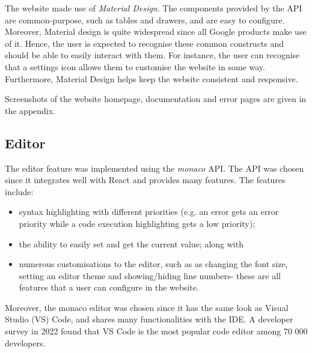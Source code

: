 

The website made use of \emph{Material Design}. The components provided by the API are common-purpose, such as tables and drawers, and are easy to configure. Moreover, Material design is quite widespread since all Google products make use of it. 
Hence, the user is expected to recognise these common constructs and should be able to easily interact with them. For instance, the user can recognise that a settings icon allows them to customise the website in some way. Furthermore, Material Design helps keep the website consistent and responsive.

Screenshots of the website homepage, documentation and error pages are given in the appendix.

\subsection{Editor}

The editor feature was implemented using the \emph{monaco} API. The API was chosen since it integrates well with React and provides many features. The features include:
\begin{itemize}
    \item syntax highlighting with different priorities (e.g. an error gets an error priority while a code execution highlighting gets a low priority);
    \item the ability to easily set and get the current value; along with
    \item numerous customisations to the editor, such as as changing the font size, setting an editor theme and showing/hiding line numbers- these are all features that a user can configure in the website.
\end{itemize}
Moreover, the monaco editor was chosen since it has the same look as Visual Studio (VS) Code, and shares many functionalities with the IDE. A developer survey in 2022 found that VS Code is the most popular code editor among 70 000 developers.

